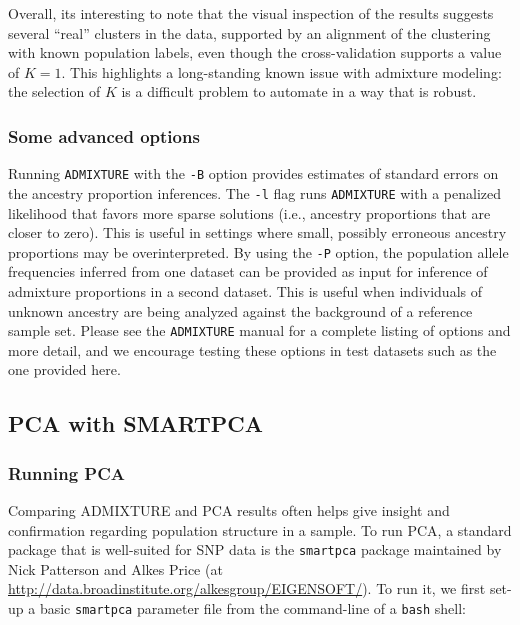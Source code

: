 \documentclass{svmult}       %
\begin{document}
Overall, its interesting to note that the visual inspection of the
results suggests several ``real'' clusters in the data, supported by an
alignment of the clustering with known population labels, even though
the cross-validation supports a value of \(K=1\). This highlights a
long-standing known issue with admixture modeling: the selection of
\(K\) is a difficult problem to automate in a way that is robust.

\subsubsection{Some advanced options}\label{some-advanced-options}

Running \texttt{ADMIXTURE} with the \texttt{-B} option provides
estimates of standard errors on the ancestry proportion inferences. The
\texttt{-l} flag runs \texttt{ADMIXTURE} with a penalized likelihood
that favors more sparse solutions (i.e., ancestry proportions that are
closer to zero). This is useful in settings where small, possibly
erroneous ancestry proportions may be overinterpreted. By using the
\texttt{-P} option, the population allele frequencies inferred from one
dataset can be provided as input for inference of admixture proportions
in a second dataset. This is useful when individuals of unknown ancestry
are being analyzed against the background of a reference sample set.
Please see the \texttt{ADMIXTURE} manual for a complete listing of
options and more detail, and we encourage testing these options in test
datasets such as the one provided here.

\subsection{PCA with SMARTPCA}\label{pca-with-smartpca}

\subsubsection{Running PCA}\label{running-pca}

Comparing ADMIXTURE and PCA results often helps give insight and
confirmation regarding population structure in a sample. To run PCA, a
standard package that is well-suited for SNP data is the
\texttt{smartpca} package maintained by Nick Patterson and Alkes Price
(at \url{http://data.broadinstitute.org/alkesgroup/EIGENSOFT/}). To run
it, we first set-up a basic \texttt{smartpca} parameter file from the
command-line of a \texttt{bash} shell:
\end{document}
